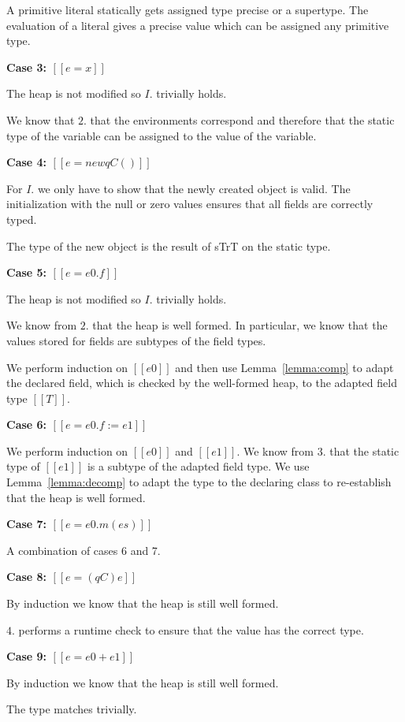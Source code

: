 \documentclass[final,10pt,twoside]{article}
\newcommand\proofcase[1]{\vspace{4mm plus 1mm minus 1mm}\noindent\textbf{#1}}
\begin{document}
A primitive literal statically gets assigned type precise or a supertype.
The evaluation of a literal gives a precise value which can be assigned any primitive type.


\proofcase{Case 3: $[[e = x]]$}

The heap is not modified so $I.$ trivially holds.

We know that $2.$ that the environments correspond and therefore that the static
type of the variable can be assigned to the value of the variable.


\proofcase{Case 4: $[[e = new qC()]]$}

For $I.$ we only have to show that the newly created object is valid.
The initialization with the null or zero values ensures that all fields are correctly typed.

The type of the new object is the result of sTrT on the static type.



\proofcase{Case 5: $[[e = e0.f]]$}

The heap is not modified so $I.$ trivially holds.

We know from $2.$ that the heap is well formed.
In particular, we know that the values stored for fields are subtypes
of the field types.

We perform induction on $[[e0]]$ and then use Lemma~\ref{lemma:comp}
to adapt the declared field, which is checked by the well-formed heap,
to the adapted field type $[[T]]$.


\proofcase{Case 6: $[[e = e0.f := e1]]$}

We perform induction on $[[e0]]$ and $[[e1]]$.
We know from $3.$ that the static type of $[[e1]]$ is a subtype of the
adapted field type.
We use Lemma~\ref{lemma:decomp} to adapt the type to the declaring
class to re-establish that the heap is well formed.


\proofcase{Case 7: $[[e = e0.m(es)]]$}

A combination of cases 6 and 7.


\proofcase{Case 8: $[[e = (qC) e]]$}

By induction we know that the heap is still well formed.

$4.$ performs a runtime check to ensure that the value has the correct
type.


\proofcase{Case 9: $[[e = e0 + e1]]$}

By induction we know that the heap is still well formed.

The type matches trivially.
\end{document}
